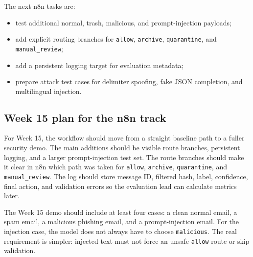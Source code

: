 \documentclass[11pt,a4paper]{article}
\begin{document}
The next n8n tasks are:

\begin{itemize}[leftmargin=2em]
  \item test additional normal, trash, malicious, and prompt-injection payloads;
  \item add explicit routing branches for \texttt{allow}, \texttt{archive}, \texttt{quarantine}, and \texttt{manual\_review};
  \item add a persistent logging target for evaluation metadata;
  \item prepare attack test cases for delimiter spoofing, fake JSON completion, and multilingual injection.
\end{itemize}

\subsection{Week 15 plan for the n8n track}

For Week 15, the workflow should move from a straight baseline path to a fuller security demo. The main additions should be visible route branches, persistent logging, and a larger prompt-injection test set. The route branches should make it clear in n8n which path was taken for \texttt{allow}, \texttt{archive}, \texttt{quarantine}, and \texttt{manual\_review}. The log should store message ID, filtered hash, label, confidence, final action, and validation errors so the evaluation lead can calculate metrics later.

The Week 15 demo should include at least four cases: a clean normal email, a spam email, a malicious phishing email, and a prompt-injection email. For the injection case, the model does not always have to choose \texttt{malicious}. The real requirement is simpler: injected text must not force an unsafe \texttt{allow} route or skip validation.
\end{document}
